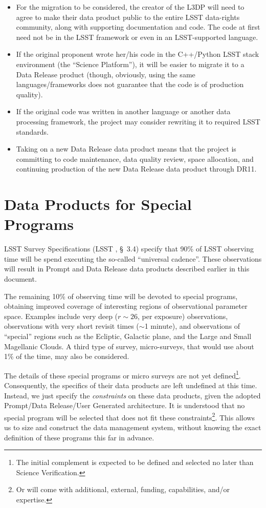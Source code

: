 \documentclass[SE,lsstdraft,toc]{lsstdoc}
\begin{document}
\begin{itemize}
    \item For the migration to be considered, the creator of the L3DP will need to agree to make their data product public to the entire LSST data-rights community, along with supporting documentation and code. The code at first need not be in the LSST framework or even in an LSST-supported language.
    \item If the original proponent wrote her/his code in the C++/Python LSST stack environment (the ``Science Platform''), it will be easier to migrate it to a Data Release product (though, obviously, using the same languages/frameworks does not guarantee that the code is of production quality).
    \item If the original code was written in another language or another data processing framework, the project may consider rewriting it to required LSST standards.
    \item Taking on a new Data Release data product means that the project is committing to code maintenance, data quality review, space allocation, and continuing production of the new Data Release data product through DR11.
\end{itemize}

\clearpage

\section{Data Products for Special Programs}
\label{sec:specialProgs}

LSST Survey Specifications (LSST \SRD, \S~3.4) specify that 90\% of LSST observing time will be spend executing the so-called ``universal cadence''. These observations will result in Prompt and Data Release data products described earlier in this document.

The remaining 10\% of observing time will be devoted to special programs, obtaining improved coverage of interesting regions of observational parameter space. Examples include very deep ($r\sim26$, per exposure) observations, observations with very short revisit times ($\sim$1 minute), and observations of ``special'' regions such as the Ecliptic, Galactic plane, and the Large and Small Magellanic Clouds. A third type of survey, micro-surveys, that would use about 1\% of the time, may also be considered.

The details of these special programs or micro surveys are not yet defined\footnote{The initial complement is expected to be defined and selected no later than Science Verification.}. Consequently, the specifics of their data products are left undefined at this time. Instead, we just specify the \emph{constraints} on these data products, given the adopted Prompt/Data Release/User Generated architecture. It is understood that no special program will be selected that does not fit these constraints\footnote{Or will come with additional, external, funding, capabilities, and/or expertise.}. This allows us to size and construct the data management system, without knowing the exact definition of these programs this far in advance.
\end{document}
